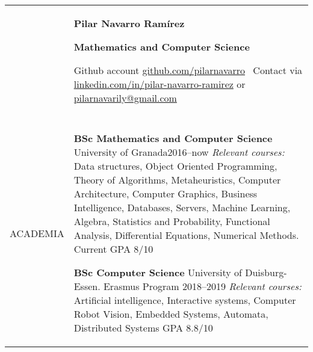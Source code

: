 \documentclass[letterpaper,10pt,oneside]{article}
\newcommand{\DatestampY}[1]{#1}
\newenvironment{body}
{\par\par
\begin{longtable}{p{0.125\textwidth}p{0.84\textwidth}}}
{\par\end{longtable}\par}
\renewcommand{\section}[3]{\\[-0.7cm]\pdfbookmark[2]{#2}{#3}\\%
\raggedleft  %
{\fontsize{9.5pt}{9.5pt}\selectfont\bfseries\raggedright%
\MakeUppercase{#1}}&}
\newcommand{\SmallEntryGap}{\par\vspace{0.38em}\par}
\newcommand{\roundpic}[4][]{
\tikz\node [circle, minimum width = #2,
path picture = {
\node [#1] at (path picture bounding box.center) {
\texttt{[image: \#4]}};
}] {};}
\begin{document}
\begin{body}
	
	&
	\vspace{-2.45cm} \par
	\huge{\textbf{Pilar Navarro Ramírez}} \par
	\large{\textbf{Mathematics and Computer Science}} \par
	\normalsize{Github account \href{https://github.com/pilarnavarro}{github.com/pilarnavarro} \textemdash\ Contact via  \href{https://www.linkedin.com/in/pilar-navarro-ramirez/} {linkedin.com/in/pilar-navarro-ramirez} or \href{pilarnavarily@gmail.com} {pilarnavarily@gmail.com}}
	\vspace{0.1cm}
	
	
	
	
	\section{Academia}{Academia}{PDF:Academia}
	
	\textbf{BSc Mathematics and Computer Science} University of Granada\hfill \DatestampY{2016}--\DatestampY{now} \newline
	\textit{Relevant courses:} Data structures, Object Oriented Programming, Theory of Algorithms, Metaheuristics,  Computer Architecture, Computer Graphics, Business Intelligence, Databases, Servers, Machine Learning, Algebra, Statistics and Probability, Functional Analysis, Differential Equations, Numerical Methods. \newline
	Current GPA 8/10
	
	\textbf{BSc Computer Science} University of Duisburg-Essen. Erasmus Program \hfill \DatestampY{2018}--\DatestampY{2019} \newline
	\textit{Relevant courses:} Artificial intelligence, Interactive systems, Computer Robot Vision, Embedded Systems, Automata, Distributed Systems \newline
	GPA 8.8/10
	

\end{body}
\end{document}
